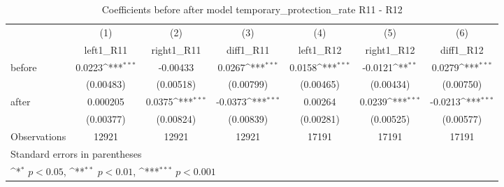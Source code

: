 \begin{table}[!ht]\centering \footnotesize
\def\sym#1{\ifmmode^{#1}\else\(^{#1}\)\fi}
\caption{Coefficients before after model temporary\_protection\_rate R11 - R12}
\begin{tabular}{l*{6}{c}}
\hline\hline
                    &\multicolumn{1}{c}{(1)}&\multicolumn{1}{c}{(2)}&\multicolumn{1}{c}{(3)}&\multicolumn{1}{c}{(4)}&\multicolumn{1}{c}{(5)}&\multicolumn{1}{c}{(6)}\\
                    &\multicolumn{1}{c}{left1\_R11}&\multicolumn{1}{c}{right1\_R11}&\multicolumn{1}{c}{diff1\_R11}&\multicolumn{1}{c}{left1\_R12}&\multicolumn{1}{c}{right1\_R12}&\multicolumn{1}{c}{diff1\_R12}\\
\hline
before              &      0.0223\sym{***}&    -0.00433         &      0.0267\sym{***}&      0.0158\sym{***}&     -0.0121\sym{**} &      0.0279\sym{***}\\
                    &   (0.00483)         &   (0.00518)         &   (0.00799)         &   (0.00465)         &   (0.00434)         &   (0.00750)         \\
[1em]
after               &    0.000205         &      0.0375\sym{***}&     -0.0373\sym{***}&     0.00264         &      0.0239\sym{***}&     -0.0213\sym{***}\\
                    &   (0.00377)         &   (0.00824)         &   (0.00839)         &   (0.00281)         &   (0.00525)         &   (0.00577)         \\
\hline
Observations        &       12921         &       12921         &       12921         &       17191         &       17191         &       17191         \\
\hline\hline
\multicolumn{7}{l}{\footnotesize Standard errors in parentheses}\\
\multicolumn{7}{l}{\footnotesize \sym{*} \(p<0.05\), \sym{**} \(p<0.01\), \sym{***} \(p<0.001\)}\\
\end{tabular}
\end{table}
